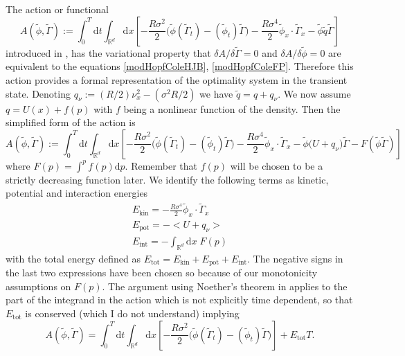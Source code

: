 \documentclass[letterpaper, 12pt]{article}
\newcommand{\rd}{{\mathrm d}}
\newcommand{\Rb}{\mathbb{R}}
\newcommand{\tilGamma}{\tilde{\Gamma}}
\newcommand{\tilphi}{\tilde{\phi}}
\begin{document}
The action or functional
\begin{equation}
A(\tilphi,\tilGamma) := \int_{0}^{T} \rd t \int_{\Rb^d} \rd x \left[ -\frac{R \sigma^2}{2} \big( \tilphi(\tilGamma_t) - (\tilphi_t) \tilGamma \big) - \frac{R \sigma^4}{2} \tilphi_x \cdot \tilGamma_x - \tilphi \tilde{q} \tilGamma \right]
\end{equation}
introduced in \cite{Ullmo2017}, has the variational property that $\delta A/\delta \tilGamma = 0$ and $\delta A/\delta \tilphi = 0$ are equivalent to the equations \eqref{modHopfColeHJB}, \eqref{modHopfColeFP}. Therefore this action provides a formal representation of the optimality system in the transient state. Denoting $q_\nu := (R/2)\nu_x^2 - (\sigma^2R/2)$ we have $\tilde{q} = q + q_\nu$. We now assume $q = U(x) + f(p)$ with $f$ being a nonlinear function of the density. Then the simplified form of the action is
\begin{equation}
A(\tilphi,\tilGamma) := \int_{0}^{T} \rd t \int_{\Rb^d} \rd x \left[ -\frac{R \sigma^2}{2} \big( \tilphi(\tilGamma_t) - (\tilphi_t) \tilGamma \big) - \frac{R \sigma^4}{2} \tilphi_x \cdot \tilGamma_x - \tilphi \big( U + q_\nu \big) \tilGamma - F(\tilphi \tilGamma) \right] \label{simplifyaction}
\end{equation}
where $F(p) = \int^p f(p) \rd p$. Remember that $f(p)$ will be chosen to be a strictly decreasing function later. We identify the following terms as kinetic, potential and interaction energies
\begin{align}
E_\text{kin} = -\frac{R \sigma^4}{2} \tilphi_x \cdot \tilGamma_x \\
E_\text{pot} = -\big< U + q_\nu \big> \\
E_\text{int} = -\int_{\Rb^d} \rd x \; F(p)
\end{align}
with the total energy defined as $E_\text{tot} = E_\text{kin} + E_\text{pot} + E_\text{int}$. The negative signs in the last two expressions have been chosen so because of our monotonicity assumptions on $F(p)$. The argument using Noether's theorem \cite{Papas2014} in \cite{Ullmo2017} applies to the part of the integrand in the action which is not explicitly time dependent, so that $E_\text{tot}$ is conserved {\color{blue} (which I do not understand)} implying
\begin{equation}
A(\tilphi,\tilGamma) = \int_{0}^{T} \rd t \int_{\Rb^d} \rd x \left[ -\frac{R \sigma^2}{2} \big( \tilphi(\tilGamma_t) - (\tilphi_t) \tilGamma \big) \right] + E_\text{tot} T.
\end{equation}
\end{document}
